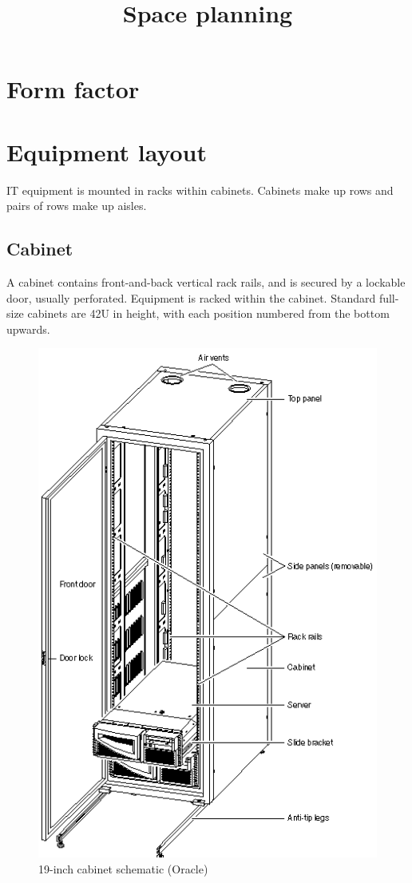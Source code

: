 \documentclass{pgnotes}
\title{Space planning}
\begin{document}
\section{Form factor}

\section{Equipment layout}

IT equipment is mounted in racks within cabinets.
Cabinets make up rows and pairs of rows make up aisles.


\subsection{Cabinet}

A cabinet contains front-and-back vertical rack rails, and is secured by a lockable door, usually perforated.
Equipment is racked within the cabinet.
Standard full-size cabinets are 42U in height, with each position numbered from the bottom upwards.

\begin{figure}[htbp]
  \centering
  \includegraphics[width=1.0\linewidth,height=0.8\paperheight,keepaspectratio]{cabinet}
  \caption{19-inch cabinet schematic (Oracle)}
  \label{fig:cabinet}
\end{figure}
\end{document}
